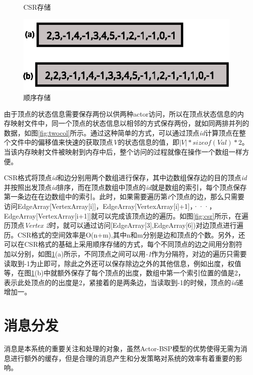 \begin{figure}[htbp]
\begin{minipage}{0.4\textwidth}
\caption{CSR存储}\label{fig:csr}
\end{minipage}
\begin{minipage}{0.4\textwidth}
\centering
\includegraphics[width=\textwidth]{myfigures/ncsr.eps}
\caption{顺序存储}\label{fig:ncsr}
\end{minipage}

\vspace{\baselineskip}
\end{figure}

由于顶点的状态信息需要保存两份以供两种actor访问，所以在顶点状态信息的内存映射文件中，同一个顶点的状态信息以相邻的方式保存两份，就如同两排并列的数据，如图\ref{fig:twocol}所示。通过这种简单的方式，可以通过顶点\textit{id}计算顶点在整个文件中的偏移值来快速的获取顶点\textit{V}的状态信息的值，即$|V| * sizeof(Val)*2$。当该内存映射文件被映射到内存中后，整个访问的过程就像在操作一个数组一样方便。

CSR格式将顶点\textit{id}和边分别用两个数组进行保存，其中边数组保存边的目的顶点\textit{id}并按照出发顶点\textit{id}排序，而在顶点数组中顶点的\textit{id}就是数组的索引，每个顶点保存第一条边在在边数组中的索引。此时，如果需要遍历第\textit{i}个顶点的边，那么只需要访问EdgeArray[VertexArray[i]]，EdgeArray[VertexArray[i]+1]，···，EdgeArray[VertexArray[i+1]]就可以完成该顶点边的遍历。如图\ref{fig:csr}所示，在遍历顶点\textit{Vertex 2}时，就可以通过访问[EdgeArray[3],EdgeArray[6])对边顶点进行遍历。CSR格式的空间效率是O(n+m),其中n和m分别是边和顶点的个数。另外，还可以在CSR格式的基础上采用顺序存储的方式，每个不同顶点的边之间用分割符加以分别，如图\ref{fig:ncsr}(a)所示，不同顶点之间可以用\textit{-1}作为分隔符，对边的遍历只需要读取到-1为止即可，除此之外还可以保存除边之外的其他信息，例如出度，权值等，在图\ref{fig:ncsr}(b)中就额外保存了每个顶点的出度，数组中第一个索引位置的值是2，表示此处顶点的的出度是2，紧接着的是两条边，当读取到-1的时候，顶点的\textit{id}递增加一。

\section{消息分发}
消息是本系统的重要关注和处理的对象，虽然Actor-BSP模型的优势使得无需为消息进行额外的缓存，但是合理的消息产生和分发策略对系统的效率有着重要的影响。
